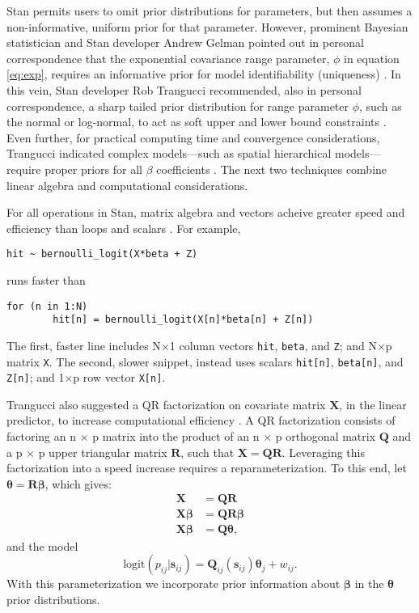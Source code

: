 Stan permits users to omit prior distributions for parameters, but then assumes a non-informative, uniform prior for that parameter. However, prominent Bayesian statistician and Stan developer Andrew Gelman pointed out in personal correspondence that the exponential covariance range parameter, $\phi$ in equation \ref{eq:exp}, requires an informative prior for model identifiability (uniqueness) \citep{Gelman2014}. In this vein, Stan developer Rob Trangucci recommended, also in personal correspondence, a sharp tailed prior distribution for range parameter $\phi$, such as the normal or log-normal, to act as soft upper and lower bound constraints \citep{Trangucci}. Even further, for practical computing time and convergence considerations, Trangucci indicated complex models---such as spatial hierarchical models---require proper priors for all $\beta$ coefficients \citep{Trangucci}. The next two techniques combine linear algebra and computational considerations.

For all operations in Stan, matrix algebra and vectors acheive greater speed and efficiency than loops and scalars \citep{STANtheMan}. For example, 
\begin{verbatim}
hit ~ bernoulli_logit(X*beta + Z)
\end{verbatim}
runs faster than
\begin{verbatim}
for (n in 1:N)
        hit[n] = bernoulli_logit(X[n]*beta[n] + Z[n])
\end{verbatim}
The first, faster line includes N$\times$1 column vectors \verb|hit|, \verb|beta|, and \verb|Z|; and N$\times$p matrix \verb|X|. The second, slower snippet, instead uses scalars \verb|hit[n]|, \verb|beta[n]|, and \verb|Z[n]|; and 1$\times$p row vector \verb|X[n]|.

Trangucci also suggested a QR factorization on covariate matrix $\pmb{X}$, in the linear predictor, to increase computational efficiency \citep{Trangucci}. A QR factorization consists of factoring an n $\times$ p matrix into the product of an n $\times$ p orthogonal matrix $\pmb{Q}$ and a p $\times$ p upper triangular matrix $\pmb{R}$, such that $\pmb{X} = \pmb{QR}$. Leveraging this factorization into a speed increase requires a reparameterization. To this end, let $\pmb{\theta} = \pmb{R \beta}$, which gives:
\begin{align}
\pmb{X} &= \pmb{QR} \\
\pmb{X \beta} &= \pmb{QR \beta} \\
\pmb{X \beta} &= \pmb{Q \theta},
\end{align}
and the model
\begin{equation} \label{eq:reparam}
\text{logit}(p_{ij}|\pmb{s}_{ij}) = \pmb{Q}_{ij}(\pmb{s}_{ij}) \pmb{\theta}_{j} + w_{ij}.
\end{equation}
With this parameterization we incorporate prior information about $\pmb{\beta}$ in the $\pmb{\theta}$ prior distributions. 

